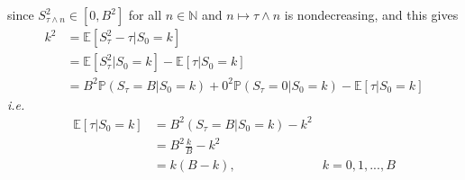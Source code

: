 \documentclass[12pt]{extarticle}
\newcommand{\<}{\langle}
\renewcommand{\>}{\rangle}
\theoremstyle{definition}
\begin{document}
since $S_{\tau \wedge n}^2 \in [0, B^2]$ for all $n \in \mathbb{N}$ and $n \mapsto \tau \wedge n$ is nondecreasing, and this gives
\begin{align*}
    k^2 &= \mathbb{E}[S_\tau^2 - \tau| S_0 =k]\\
    &= \mathbb{E}[S_\tau^2| S_0 =k] - \mathbb{E}[\tau| S_0 =k]\\
    &= B^2 \mathbb{P}(S_\tau =B|S_0 = k) + 0^2 \mathbb{P}(S_\tau =0|S_0 = k) - \mathbb{E}[\tau| S_0 =k]
\end{align*}
\textit{i.e.}
\begin{align*}
    \mathbb{E}[\tau| S_0 =k] &= B^2(S_\tau =B|S_0 = k)-k^2\\
    &= B^2 \frac{k}{B} -k^2\\
    &= k(B-k), & k=0,1,...,B
\end{align*}

\newpage
\end{document}
